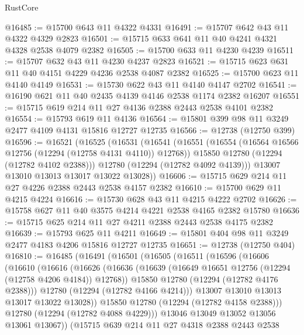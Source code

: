 \begin{lexlean}{RustCore}
\begin{coremodule}
@16485 := @15700 @643 @11 @4322 @4331
@16491 := @15707 @642 @43 @11 @4322 @4329 @2823
@16501 := @15715 @633 @641 @11 @40 @4241 @4321 @4328 @2538 @4079 @2382
@16505 := @15700 @633 @11 @4230 @4239
@16511 := @15707 @632 @43 @11 @4230 @4237 @2823
@16521 := @15715 @623 @631 @11 @40 @4151 @4229 @4236 @2538 @4087 @2382
@16525 := @15700 @623 @11 @4140 @4149
@16531 := @15730 @622 @43 @11 @4140 @4147 @2702
@16541 := @16190 @621 @11 @40 @2435 @4139 @4146 @2538 @1174 @2382 @16207
@16551 := @15715 @619 @214 @11 @27 @4136 @2388 @2443 @2538 @4101 @2382
@16554 := @15793 @619 @11 @4136
@16564 := @15801 @399 @98 @11 @3249 @2477 @4109 @4131 @15816 @12727 @12735
@16566 := @12738 (@12750 @399)
@16596 := @16521
    (@16525
      (@16531
        (@16541
          (@16551
            (@16554 (@16564 @16566 @12756 (@12294 (@12758 @4131 @4110)) @12768))
            @15850
            @12780
            (@12294 (@12782 @4102 @2388)))
          @12780
          (@12294 (@12782 @4092 @4139)))
        @13007
        @13010
        @13013
        @13017
        @13022
        @13028))
@16606 := @15715 @629 @214 @11 @27 @4226 @2388 @2443 @2538 @4157 @2382
@16610 := @15700 @629 @11 @4215 @4224
@16616 := @15730 @628 @43 @11 @4215 @4222 @2702
@16626 := @15758 @627 @11 @40 @3575 @4214 @4221 @2538 @4165 @2382 @15780
@16636 := @15715 @625 @214 @11 @27 @4211 @2388 @2443 @2538 @4175 @2382
@16639 := @15793 @625 @11 @4211
@16649 := @15801 @404 @98 @11 @3249 @2477 @4183 @4206 @15816 @12727 @12735
@16651 := @12738 (@12750 @404)
@16810 := @16485
    (@16491
      (@16501
        (@16505
          (@16511
            (@16596
              (@16606
                (@16610
                  (@16616
                    (@16626
                      (@16636
                        (@16639 (@16649 @16651 @12756 (@12294 (@12758 @4206 @4184)) @12768))
                        @15850
                        @12780
                        (@12294 (@12782 @4176 @2388)))
                      @12780
                      (@12294 (@12782 @4166 @4214)))
                    @13007
                    @13010
                    @13013
                    @13017
                    @13022
                    @13028))
                @15850
                @12780
                (@12294 (@12782 @4158 @2388)))
              @12780
              (@12294 (@12782 @4088 @4229)))
            @13046
            @13049
            @13052
            @13056
            @13061
            @13067))
        (@15715
          @639
          @214
          @11
          @27
          @4318
          @2388
          @2443
          @2538

\end{coremodule}
\end{lexlean}
